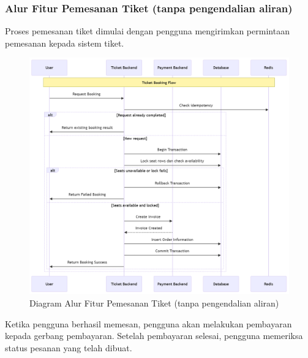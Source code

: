 \pagebreak

\subsubsection{Alur Fitur Pemesanan Tiket (tanpa pengendalian aliran)}

Proses pemesanan tiket dimulai dengan pengguna mengirimkan permintaan pemesanan kepada sistem tiket.

\begin{figure}[h]
    \centering
    \includegraphics[width=1\textwidth]{resources/chapter-3/book-flow.png}
    \caption{Diagram Alur Fitur Pemesanan Tiket (tanpa pengendalian aliran)}
    \label{fig:flow-book-flow}
\end{figure}

\pagebreak

Ketika pengguna berhasil memesan, pengguna akan melakukan pembayaran kepada gerbang pembayaran. Setelah pembayaran selesai, pengguna memeriksa status pesanan yang telah dibuat.

